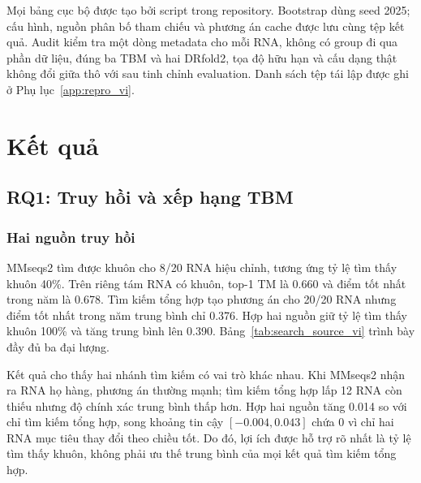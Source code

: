 \documentclass[12pt,a4paper,oneside]{report}
\begin{document}
Mọi bảng cục bộ được tạo bởi script trong repository. Bootstrap dùng seed 2025; cấu hình,
nguồn phân bố tham chiếu và phương án cache được lưu cùng tệp kết quả. Audit kiểm tra một dòng metadata
cho mỗi RNA, không có group đi qua phần dữ liệu, đúng ba TBM và hai DRfold2, tọa độ hữu hạn và
cấu dạng thật không đổi giữa thô với sau tinh chỉnh evaluation. Danh sách tệp tái lập được
ghi ở Phụ lục~\ref{app:repro_vi}.

\chapter{Kết quả}
\label{chap:results_vi}

\section{RQ1: Truy hồi và xếp hạng TBM}

\subsection{Hai nguồn truy hồi}

MMseqs2 tìm được khuôn cho 8/20 RNA hiệu chỉnh, tương ứng tỷ lệ tìm thấy khuôn 40\%. Trên
riêng tám RNA có khuôn, top-1 TM là 0.660 và điểm tốt nhất trong năm là 0.678. Tìm kiếm
tổng hợp tạo phương án cho 20/20 RNA nhưng điểm tốt nhất trong năm trung bình chỉ 0.376.
Hợp hai nguồn giữ
tỷ lệ tìm thấy khuôn 100\% và tăng trung bình lên 0.390. Bảng~\ref{tab:search_source_vi} trình bày
đầy đủ ba đại lượng.

\begin{table}[H]
\centering
\caption{Ảnh hưởng của nguồn truy hồi trên 20 RNA hiệu chỉnh. Chất lượng MMseqs2 được
tính có điều kiện trên tám RNA tìm thấy khuôn.}
\label{tab:search_source_vi}
\end{table}

Kết quả cho thấy hai nhánh tìm kiếm có vai trò khác nhau. Khi MMseqs2 nhận ra RNA họ hàng,
phương án thường mạnh; tìm kiếm tổng hợp lấp 12 RNA còn thiếu nhưng độ chính xác trung
bình thấp hơn. Hợp hai nguồn tăng 0.014 so với chỉ tìm kiếm tổng hợp, song khoảng tin cậy
$[-0.004,0.043]$ chứa 0 vì chỉ hai RNA mục tiêu thay đổi theo chiều tốt. Do đó, lợi ích
được hỗ trợ rõ nhất là tỷ lệ tìm thấy khuôn, không phải ưu thế trung bình của mọi kết quả
tìm kiếm tổng hợp.
\end{document}
